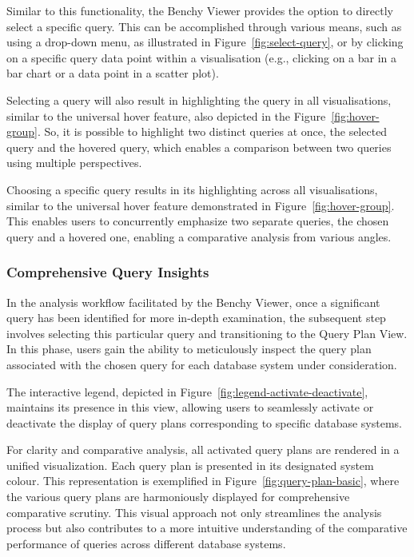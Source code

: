 Similar to this functionality, the Benchy Viewer provides the option to directly select a specific query. This can be accomplished through various means, such as using a drop-down menu, as illustrated in Figure~\ref{fig:select-query}, or by clicking on a specific query data point within a visualisation (e.g., clicking on a bar in a bar chart or a data point in a scatter plot).


Selecting a query will also result in highlighting the query in all visualisations, similar to the universal hover feature, also depicted in the Figure~\ref{fig:hover-group}. So, it is possible to highlight two distinct queries at once, the selected query and the hovered query, which enables a comparison between two queries using multiple perspectives. 

Choosing a specific query results in its highlighting across all visualisations, similar to the universal hover feature demonstrated in Figure~\ref{fig:hover-group}. This enables users to concurrently emphasize two separate queries, the chosen query and a hovered one, enabling a comparative analysis from various angles.

\subsubsection{Comprehensive Query Insights}

In the analysis workflow facilitated by the Benchy Viewer, once a significant query has been identified for more in-depth examination, the subsequent step involves selecting this particular query and transitioning to the Query Plan View. In this phase, users gain the ability to meticulously inspect the query plan associated with the chosen query for each database system under consideration.

The interactive legend, depicted in Figure~\ref{fig:legend-activate-deactivate}, maintains its presence in this view, allowing users to seamlessly activate or deactivate the display of query plans corresponding to specific database systems.

For clarity and comparative analysis, all activated query plans are rendered in a unified visualization. Each query plan is presented in its designated system colour. This representation is exemplified in Figure~\ref{fig:query-plan-basic}, where the various query plans are harmoniously displayed for comprehensive comparative scrutiny. This visual approach not only streamlines the analysis process but also contributes to a more intuitive understanding of the comparative performance of queries across different database systems.

